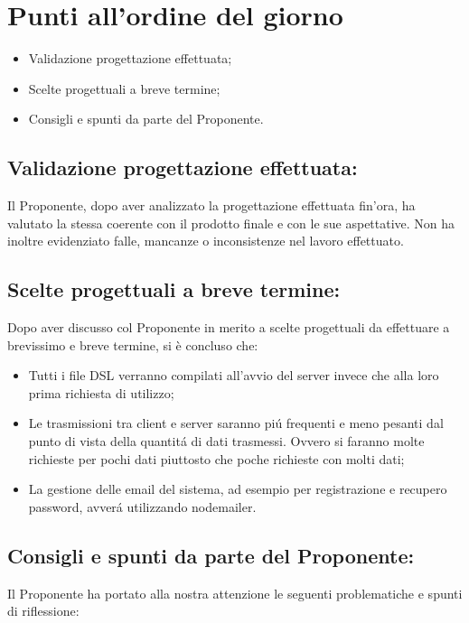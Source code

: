 \newpage
\section{Punti all'ordine del giorno}
\label{2}

\begin{itemize}
\item Validazione progettazione effettuata;
\item Scelte progettuali a breve termine;
\item Consigli e spunti da parte del Proponente.
\end{itemize}


\subsection{Validazione progettazione effettuata:}
Il Proponente, dopo aver analizzato la progettazione effettuata fin'ora, ha valutato la stessa coerente con il prodotto finale e con le sue aspettative.
Non ha inoltre evidenziato falle, mancanze o inconsistenze nel lavoro effettuato.

\subsection{Scelte progettuali a breve termine:}
Dopo aver discusso col Proponente in merito a scelte progettuali da effettuare a brevissimo e breve termine, si è concluso che:

\begin{itemize}
\item Tutti i file DSL verranno compilati all'avvio del server invece che alla loro prima richiesta di utilizzo;
\item Le trasmissioni tra client e server saranno pi\'{u} frequenti e meno pesanti dal punto di vista della quantit\'{a} di dati trasmessi. Ovvero si faranno molte richieste per pochi dati piuttosto che poche richieste con molti dati;
\item La gestione delle email del sistema, ad esempio per registrazione e recupero password, avver\'{a} utilizzando nodemailer.
\end{itemize}


\subsection{Consigli e spunti da parte del Proponente:}
Il Proponente ha portato alla nostra attenzione le seguenti problematiche e spunti di riflessione:

